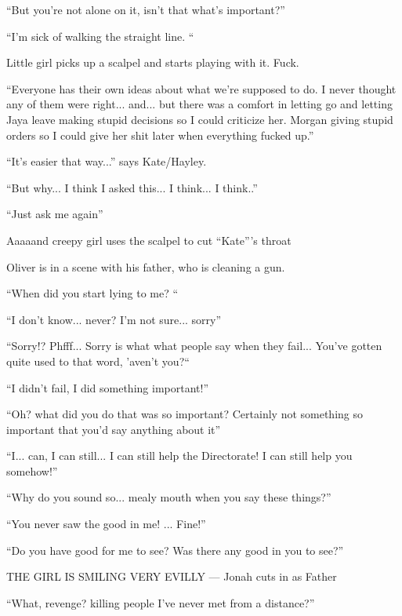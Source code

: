 ``But you're not alone on it, isn't that what's important?''

``I'm sick of walking the straight line. ``



Little girl picks up a scalpel and starts playing with it. Fuck. 



``Everyone has their own ideas about what we're supposed to do. I never thought any of them were right... and... but there was a comfort in letting go and letting Jaya leave making stupid decisions so I could criticize her.  Morgan giving stupid orders so I could give her shit later when everything fucked up.''

``It's easier that way...'' says Kate/Hayley.

``But why... I think I asked this... I think... I think..''

``Just ask me again''

Aaaaand creepy girl uses the scalpel to cut ``Kate'''s throat




Oliver is in a scene with his father, who is cleaning a gun. 

``When did you start lying to me? ``

``I don't know... never? I'm not sure... sorry''

``Sorry!? Phfff... Sorry is what what people say when they fail... You've gotten quite used to that word, 'aven't you?``

``I didn't fail, I did something important!''

``Oh? what did you do that was so important?  Certainly not something so important that you'd say anything about it''

``I... can, I can still... I can still help the Directorate! I can still help you somehow!''

``Why do you sound so... mealy mouth when you say these things?''

``You never saw the good in me!  ... Fine!''

``Do you have good for me to see?  Was there any good in you to see?''



THE GIRL IS SMILING VERY EVILLY --- Jonah cuts in as Father



``What, revenge? killing people I've never met from a distance?''

